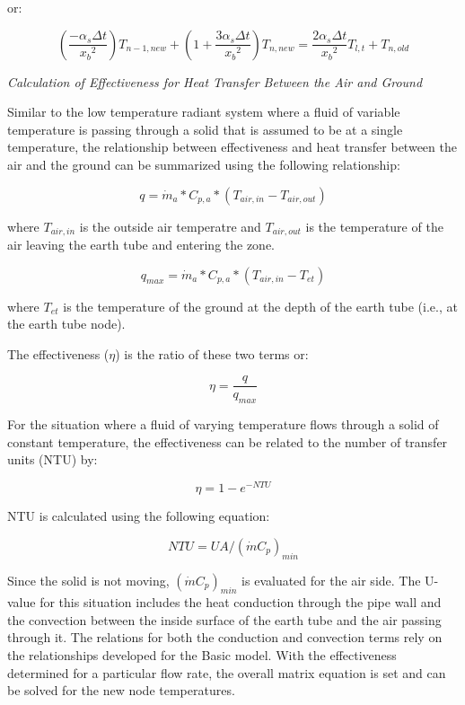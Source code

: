 or:

\begin{equation}
(\frac{-\alpha_s \Delta t}{{x_b}^2}) T_{n-1,new} + (1 + \frac{3 \alpha_s \Delta t}{{x_b}^2}) T_{n,new} = \frac{2 \alpha_s \Delta t}{{x_b}^2} T_{l,t} + T_{n,old}
\end{equation}

\emph{\textit{Calculation of Effectiveness for Heat Transfer Between the Air and Ground}}

Similar to the low temperature radiant system where a fluid of variable temperature is passing through a solid that is assumed to be at a single temperature, the relationship between effectiveness and heat transfer between the air and the ground can be summarized using the following relationship:

\begin{equation}
q = \dot m_a * C_{p,a} * (T_{air,in} - T_{air,out})
\end{equation}

where \(T_{air,in}\) is the outside air temperatre and \(T_{air,out}\) is the temperature of the air leaving the earth tube and entering the zone.

\begin{equation}
q_{max} = \dot m_a * C_{p,a} * (T_{air,in} - T_{et})
\end{equation}

where \(T_{et}\) is the temperature of the ground at the depth of the earth tube (i.e., at the earth tube node).

The effectiveness (\(\eta\)) is the ratio of these two terms or:

\begin{equation}
\eta = \frac{q}{q_{max}}
\end{equation}

For the situation where a fluid of varying temperature flows through a solid of constant temperature, the effectiveness can be related to the number of transfer units (NTU) by:

\begin{equation}
\eta = 1 - e^{-NTU}
\end{equation}

NTU is calculated using the following equation:

\begin{equation}
NTU = U A / (\dot m C_p)_{min}
\end{equation}

Since the solid is not moving, \((\dot m C_p)_{min}\) is evaluated for the air side.  The U-value for this situation includes the heat conduction through the pipe wall and the convection between the inside surface of the earth tube and the air passing through it.  The relations for both the conduction and convection terms rely on the relationships developed for the Basic model.  With the effectiveness determined for a particular flow rate, the overall matrix equation is set and can be solved for the new node temperatures.


